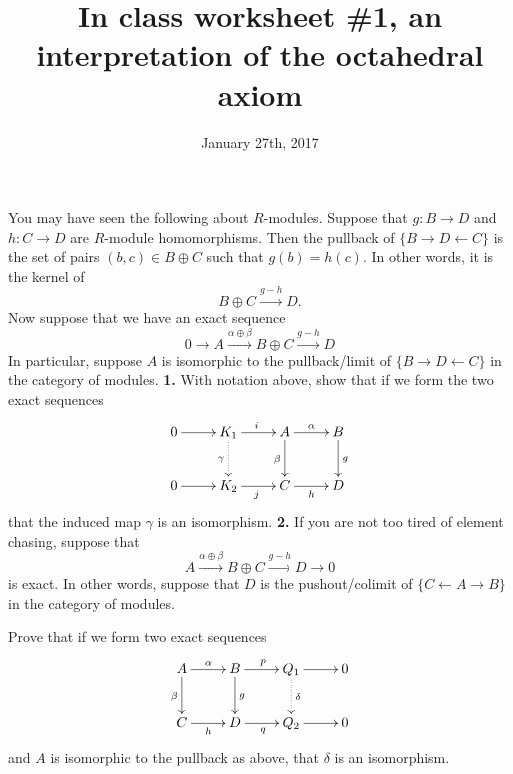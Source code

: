 \documentclass[12pt]{amsart}
\numberwithin{equation}{theorem}
\renewcommand{\:}{\colon}
\theoremstyle{theorem}
\begin{document}
\title{In class worksheet \#1, an interpretation of the octahedral axiom}
\author{January 27th, 2017}



\maketitle

%
%

You may have seen the following about $R$-modules.
\vskip 12pt
Suppose that $g : B \to D$ and $h : C \to D$ are $R$-module homomorphisms.  Then the pullback of $\{B \to D \leftarrow C \}$ is the set of pairs $(b, c) \in B \oplus C$ such that $g(b) = h(c)$.  In other words, it is the kernel of
\[
B \oplus C \xrightarrow{g - h} D.
\]
Now suppose that we have an exact sequence%
\[
0 \to A \xrightarrow{\alpha\oplus\beta} B \oplus C \xrightarrow{g - h} D
\]
In particular, suppose $A$ is isomorphic to the pullback/limit of $\{ B \to D \leftarrow C \}$ in the category of modules.
\vskip 3pt
\noindent
{\bf 1.}  With notation above, show that if we form the two exact sequences
\[
\xymatrix{
0 \ar[r] & K_1 \ar@{.>}[d]_{\gamma} \ar[r]^{i} & A \ar[d]_{\beta }\ar[r]^{\alpha} & B \ar[d]^g \\%
0 \ar[r] & K_2 \ar[r]_j & C \ar[r]_{h} & D %
}
\]
that the induced map $\gamma$ is an isomorphism.
\newpage
\noindent
{\bf 2.}  If you are not too tired of element chasing, suppose that
\[
A \xrightarrow{\alpha \oplus \beta} B \oplus C \xrightarrow{g-h} D \to 0
\]
is exact.  In other words, suppose that $D$ is the pushout/colimit of $\{ C \leftarrow A \rightarrow B \}$ in the category of modules.

Prove that if we form two exact sequences
\[
\xymatrix{
A \ar[d]_{\beta }\ar[r]^{\alpha} & B \ar[d]^g \ar[r]^p & Q_1 \ar@{.>}[d]^{\delta} \ar[r] & 0\\%
C \ar[r]_{h} & D \ar[r]_{q} & Q_2 \ar[r] & 0
}
\]
and $A$ is isomorphic to the pullback as above, that $\delta$ is an isomorphism.
\end{document}
